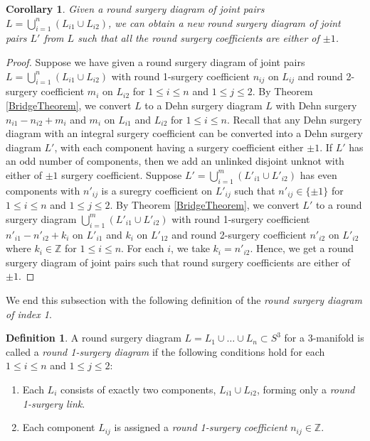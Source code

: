 \documentclass{amsart}
\theoremstyle{plain}
\newtheorem{cor}{Corollary}
\theoremstyle{remark}
\theoremstyle{definition}
\newtheorem{defn}{Definition}
\begin{document}
\begin{cor}%
Given a round surgery diagram of joint pairs $L=\bigcup_{i=1}^{n}(L_{i1} \cup L_{i2})$, we can obtain a new round surgery diagram of joint pairs $L'$ from $L$ such that all the round surgery coefficients are either of $\pm1$. 
\end{cor}
\begin{proof}
    Suppose we have given a round surgery diagram of joint pairs $L= \bigcup_{i=1}^{n}(L_{i1}\cup L_{i2})$ with round 1-surgery coefficient $n_{ij}$ on $L_{ij}$ and round 2-surgery coefficient $m_i$ on $L_{i2}$ for $1 \leq i\leq n$ and $1\leq j\leq2$. 
    By Theorem \ref{BridgeTheorem}, we convert $L$ to a Dehn surgery diagram $L$ with Dehn surgery $n_{i1}-n_{i2}+ m_i$ and $m_i$ on $L_{i1}$ and $L_{i2}$ for $ 1\leq i \leq n$. 
    Recall that any Dehn surgery diagram with an integral surgery coefficient can be converted into a Dehn surgery diagram $L'$, with each component having a surgery coefficient either $\pm1$. 
    If $L'$ has an odd number of components, then we add an unlinked disjoint unknot with either of $\pm1$ surgery coefficient. 
    Suppose $L' = \bigcup_{i=1}^{m}(L'_{i1} \cup L'_{i2})$ has even components with $n'_{ij}$ is a  suregry coefficient on $L'_{ij}$ such that $n'_{ij} \in \{\pm1\}$ for $1 \leq i\leq n$ and $1\leq j\leq 2$. 
    By Theorem \ref{BridgeTheorem}, we convert $L'$ to a round surgery diagram $\bigcup_{i=1}^{m}(L'_{i1}\cup L'_{i2})$ with round 1-surgery coefficient $n'_{i1}-n'_{i2}+k_i$ on $L'_{i1}$ and $k_i$ on $L'_{12}$ and round 2-surgery coefficient $n'_{i2}$ on $L'_{i2}$ where $k_i\in \mathbb{Z}$ for $1\leq i\leq n$. 
    For each $i$, we take $k_i=n'_{i2}$. 
    Hence, we get a round surgery diagram of joint pairs such that round surgery coefficients are either of $\pm1$.
\end{proof}

We end this subsection with the following definition of the \textit{round surgery diagram of index 1}. 

\begin{defn}
A round surgery diagram \( L = L_1 \cup \ldots \cup L_n \subset S^3 \) for a 3-manifold is called a \emph{round 1-surgery diagram} if the following conditions hold for each \( 1 \leq i \leq n \) and \( 1 \leq j \leq 2 \):
\begin{enumerate}
    \item Each \( L_i \) consists of exactly two components, \( L_{i1} \cup L_{i2} \), forming only a \emph{round 1-surgery link}.
    \item Each component \( L_{ij} \) is assigned a \emph{round 1-surgery coefficient} \( n_{ij} \in \mathbb{Z} \).
\end{enumerate}
\end{defn}
\end{document}
